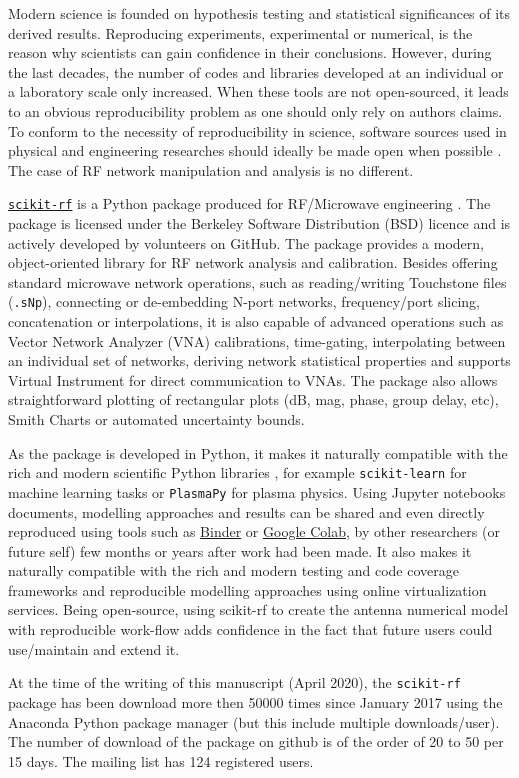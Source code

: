 Modern science is founded on hypothesis testing and statistical significances of its derived results. Reproducing experiments, experimental or numerical, is the reason why scientists can gain confidence in their conclusions. However, during the last decades, the number of codes and libraries developed at an individual or a laboratory scale only increased. When these tools are not open-sourced, it leads to an obvious reproducibility problem as one should only rely on authors claims. To conform to the necessity of reproducibility in science,  software sources used in physical and engineering researches should ideally be made open when possible . The case of RF network manipulation and analysis is no different.  

\href{http://www.scikit-rf.org}{\texttt{scikit-rf}} is a Python package produced for RF/Microwave engineering  . The package is licensed under the Berkeley Software Distribution (BSD) licence and is actively developed by volunteers on GitHub. The package provides a modern, object-oriented library for RF network analysis and calibration. Besides offering standard microwave network operations, such as reading/writing Touchstone files (\texttt{.sNp}), connecting or de-embedding N-port networks, frequency/port slicing, concatenation or interpolations, it is also capable of advanced operations such as Vector Network Analyzer (VNA) calibrations, time-gating, interpolating between an individual set of networks, deriving network statistical properties and supports Virtual Instrument for direct communication to VNAs. The package also allows straightforward plotting of rectangular plots (dB, mag, phase, group delay, etc), Smith Charts or automated uncertainty bounds. 

As the package is developed in Python, it makes it naturally compatible with the rich and modern scientific Python libraries , for example  \texttt{scikit-learn} for machine learning tasks  or \texttt{PlasmaPy}  for plasma physics. Using Jupyter notebooks documents, modelling approaches and results can be shared and even directly reproduced using tools such as \href{https://mybinder.org/}{Binder} or \href{https://colab.research.google.com/}{Google Colab}, by other researchers (or future self) few months or years after work had been made. It also makes it naturally compatible with the rich and modern testing and code coverage frameworks and reproducible modelling approaches using online
virtualization services. Being open-source, using scikit-rf to create the antenna numerical model with reproducible work-flow adds confidence
in the fact that future users could use/maintain and extend it.

At the time of the writing of this manuscript (April 2020), the \texttt{scikit-rf} package has been download more then 50000 times since January 2017 using the Anaconda Python package manager (but this include multiple downloads/user). The number of download of the package on github is of the order of 20 to 50 per 15 days. The mailing list has 124 registered users.